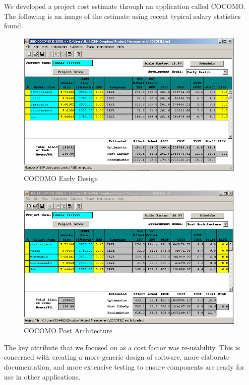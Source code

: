 We developed a project cost estimate through an application called COCOMO. The following is an image of the estimate using recent typical salary statistics 
found.

\begin{figure}[H]
\begin{center}
\includegraphics[width=14cm]{cocopre.png}
\end{center}
\caption{COCOMO Early Design}
\label{fig:letter}
\end{figure}

\begin{figure}[H]
\begin{center}
\includegraphics[width=14cm]{cocopost.png}
\end{center}
\caption{COCOMO Post Architecture }
\label{fig:letter}
\end{figure}

The key attribute that we focused on as a cost factor was re-usability. This is concerned with creating a more generic design of software, more elaborate documentation, and more extensive testing to ensure components are ready for use in other applications.



